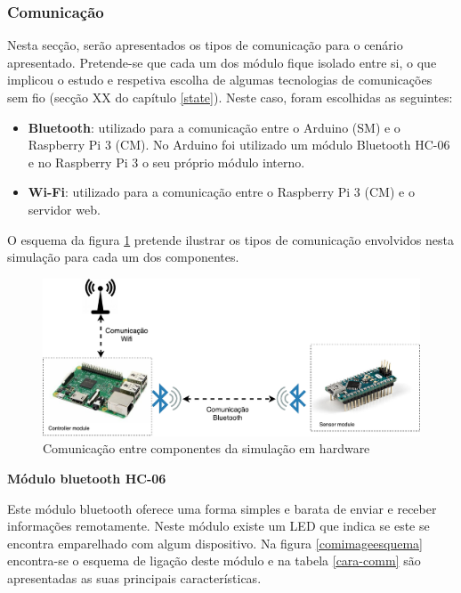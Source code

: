 \subsubsection{Comunicação}

Nesta secção, serão apresentados os tipos de comunicação para o cenário apresentado. Pretende-se que cada um dos módulo fique isolado entre si, o que implicou o estudo e respetiva escolha de algumas tecnologias de comunicações sem fio (secção XX do capítulo \ref{state}). Neste caso, foram escolhidas as seguintes: 

\begin{itemize}
	\item \textbf{Bluetooth}: utilizado para a comunicação entre o Arduino (\acl{SM}) e o Raspberry Pi 3 (\acl{CM}). No Arduino foi utilizado um módulo Bluetooth HC-06 e no Raspberry Pi 3 o seu próprio módulo interno. 
	\item \textbf{Wi-Fi}: utilizado para a comunicação entre o Raspberry Pi 3 (\acl{CM}) e o servidor web. 
\end{itemize}


O esquema da figura \ref{esquemcomm} pretende ilustrar os tipos de comunicação envolvidos nesta simulação para cada um dos componentes. 

\begin{figure}[!htb]
	\centering
	\includegraphics[width=\linewidth]{img/comm-blue/HW-geral.pdf}
	\caption{Comunicação entre componentes da simulação em hardware}
	\label{esquemcomm}
\end{figure}




\textbf{Módulo bluetooth HC-06}



Este módulo bluetooth oferece uma forma simples e barata de enviar e receber informações remotamente. Neste módulo existe um \ac{LED} que indica se este se encontra emparelhado com algum dispositivo. Na figura \ref{comimageesquema} encontra-se o esquema de ligação deste módulo e na tabela \ref{cara-comm} são apresentadas as suas principais características.



